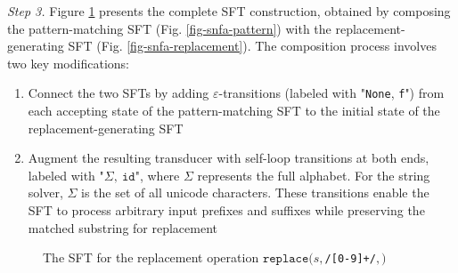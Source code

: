 \documentclass[a4paper,UKenglish,cleveref, autoref, thm-restate]{lipics-v2021}
\begin{document}
\noindent\emph{Step 3.}
Figure \ref{fig-rearranged-automata} presents the complete SFT construction, obtained by composing the pattern-matching SFT (Fig. \ref{fig-snfa-pattern}) with the replacement-generating SFT (Fig. \ref{fig-snfa-replacement}). The composition process involves two key modifications:
\begin{enumerate}
  \item Connect the two SFTs by adding $\varepsilon$-transitions (labeled with "\texttt{None}, \texttt{f}") from each accepting state of the pattern-matching SFT to the initial state of the replacement-generating SFT
  \item Augment the resulting transducer with self-loop transitions at both ends, labeled with "$\Sigma,~\texttt{id}$", where $\Sigma$ represents the full alphabet. For the string solver, $\Sigma$ is the set of all unicode characters. These transitions enable the SFT to process arbitrary input prefixes and suffixes while preserving the matched substring for replacement
\end{enumerate}

\begin{figure}[h] \centering
  \caption{The SFT for the replacement operation $\texttt{replace}(s, $\texttt{/[0-9]+/}$, $$)$}
  \label{fig-rearranged-automata}
  \end{figure}
\end{document}
